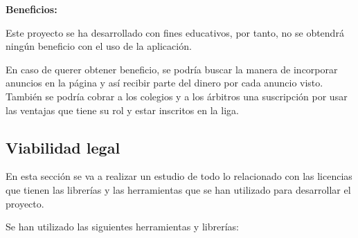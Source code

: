 \textbf{Beneficios:}

Este proyecto se ha desarrollado con fines educativos, por tanto, no se obtendrá ningún beneficio con el uso de la aplicación.

En caso de querer obtener beneficio, se podría buscar la manera de incorporar anuncios en la página y así recibir parte del dinero por cada anuncio visto. También se podría cobrar a los colegios y a los árbitros una suscripción por usar las ventajas que tiene su rol y estar inscritos en la liga.

\newpage

\subsection{Viabilidad legal}

En esta sección se va a realizar un estudio de todo lo relacionado con las licencias que tienen las librerías y las herramientas que se han utilizado para desarrollar el proyecto. 

Se han utilizado las siguientes herramientas y librerías:

